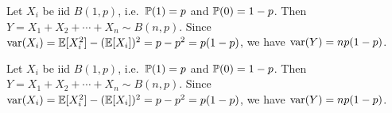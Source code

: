 \begin{note}
  \begin{field}
    \begin{eg}
      Let $X_i$ be iid $B(1, p)$, i.e.\ $\P(1) = p$ and $\P(0) = 1 - p$. Then $Y = X_1 + X_2 + \cdots + X_n \sim B(n, p)$.
      Since $\var(X_i) = \E[X_i^2] - (\E[X_i])^2 = p - p^2 = p(1 - p)$, we have $\var (Y) = np(1 - p)$.
    \end{eg}
  \end{field}
  \begin{field}
    \begin{eg}
      Let $X_i$ be iid $B(1, p)$, i.e.\ $\P(1) = p$ and $\P(0) = 1 - p$. Then $Y = X_1 + X_2 + \cdots + X_n \sim B(n, p)$.
      Since $\var(X_i) = \E[X_i^2] - (\E[X_i])^2 = p - p^2 = p(1 - p)$, we have $\var (Y) = np(1 - p)$.
    \end{eg}
  \end{field}
  \xplain{}%
\end{note}

